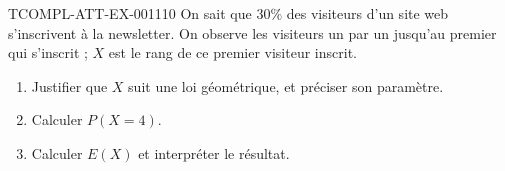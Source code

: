 \begin{exercice}{TCOMPL-ATT-EX-001}{1}{10}
On sait que $30\%$ des visiteurs d'un site web s'inscrivent à la newsletter. On observe les visiteurs un par un jusqu'au premier qui s'inscrit ; $X$ est le rang de ce premier visiteur inscrit.
\begin{enumerate}
  \item Justifier que $X$ suit une loi géométrique, et préciser son paramètre.
  \item Calculer $P(X=4)$.
  \item Calculer $E(X)$ et interpréter le résultat.
\end{enumerate}
\end{exercice}
